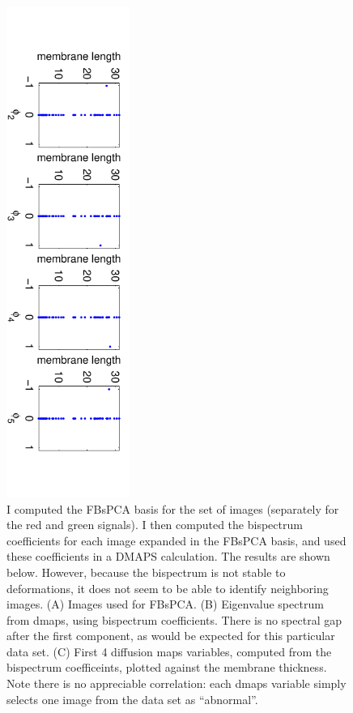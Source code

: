 \documentclass{pnastwo}
\begin{document}
\begin{figure}[t]
\hspace{-1cm}
\includegraphics[width=4cm, angle=90]{FBsPCA_dmaps}
\caption{I computed the FBsPCA basis for the set of images (separately for the red and green signals).
%
I then computed the bispectrum coefficients for each image expanded in the FBsPCA basis, and used these coefficients in a DMAPS calculation.
%
The results are shown below.
%
However, because the bispectrum is not stable to deformations, it does not seem to be able to identify neighboring images.
%
(A) Images used for FBsPCA. (B) Eigenvalue spectrum from dmaps, using bispectrum coefficients. There is no spectral gap after the first component, as would be expected for this particular data set. (C) First 4 diffusion maps variables, computed from the bispectrum coefficeints, plotted against the membrane thickness. Note there is no appreciable correlation: each dmaps variable simply selects one image from the data set as ``abnormal''.}
\end{figure}
\end{document}
